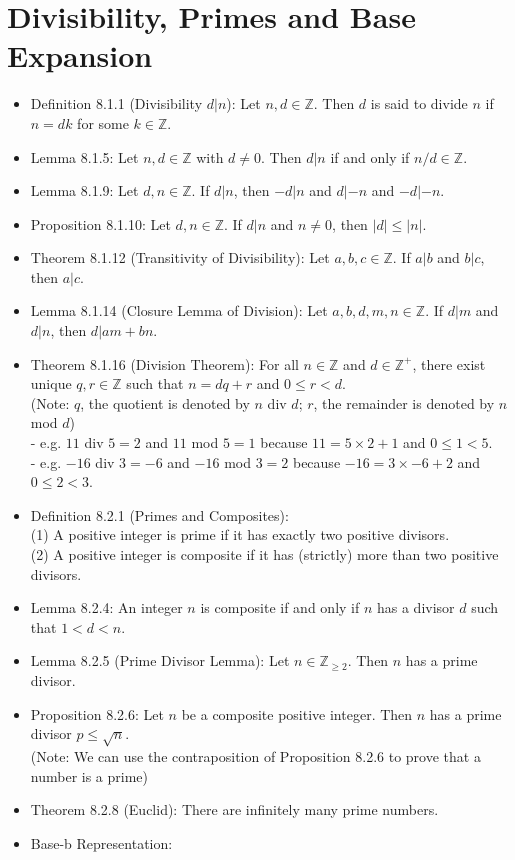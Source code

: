 \documentclass{article}
\begin{document}
\section*{Divisibility, Primes and Base Expansion}
\begin{itemize}
    \item Definition 8.1.1 (Divisibility $d|n$): Let $n,d\in \mathbb{Z}$. Then $d$ is said to divide $n$ if $n=dk$ for some $k\in \mathbb{Z}$. 
    \item Lemma 8.1.5: Let $n,d\in \mathbb{Z}$ with $d\neq 0$. Then $d|n$ if and only if $n/d\in \mathbb{Z}$.
    \item Lemma 8.1.9: Let $d,n\in \mathbb{Z}$. If $d|n$, then $-d|n$ and $d|{-n}$ and $-d|{-n}$.
    \item Proposition 8.1.10: Let $d,n\in \mathbb{Z}$. If $d|n$ and $n\neq 0$, then $|d|\leqslant|n|$.
    \item Theorem 8.1.12 (Transitivity of Divisibility): Let $a,b,c\in \mathbb{Z}$. If $a|b$ and $b|c$, then $a|c$.
    \item Lemma 8.1.14 (Closure Lemma of Division): Let $a,b,d,m,n\in \mathbb{Z}$. If $d|m$ and $d|n$, then $d|am+bn$.
    \item Theorem 8.1.16 (Division Theorem): For all $n\in \mathbb{Z}$ and $d\in \mathbb{Z}^+$, there exist unique $q,r\in \mathbb{Z}$ such that $n=dq+r$ and $0\leqslant r < d$.
        \\ (Note: $q$, the quotient is denoted by $n$ div $d$; $r$, the remainder is denoted by $n$ mod $d$)
        \\ \hspace*{3mm} - e.g. $11$ div $5 = 2$ and $11$ mod $5 = 1$ because $11 = 5\times 2 + 1$ and $0\leqslant 1 < 5$.
        \\ \hspace*{3mm} - e.g. $-16$ div $3=-6$ and $-16$ mod $3=2$ because $-16=3\times -6 + 2$ and $0\leqslant2 < 3$.
    \item Definition 8.2.1 (Primes and Composites):
        \\ \hspace*{3mm} (1) A positive integer is prime if it has exactly two positive divisors.
        \\ \hspace*{3mm} (2) A positive integer is composite if it has (strictly) more than two positive divisors.
    \item Lemma 8.2.4: An integer $n$ is composite if and only if $n$ has a divisor $d$ such that $1<d<n$.
    \item Lemma 8.2.5 (Prime Divisor Lemma): Let $n\in \mathbb{Z}_{\geqslant 2}$. Then $n$ has a prime divisor.
    \item Proposition 8.2.6: Let $n$ be a composite positive integer. Then $n$ has a prime divisor $p \leqslant \sqrt{n}$.
        \\ (Note: We can use the contraposition of Proposition 8.2.6 to prove that a number is a prime)
    \item Theorem 8.2.8 (Euclid): There are infinitely many prime numbers.
    \item Base-b Representation:
    

\end{itemize}
\end{document}
